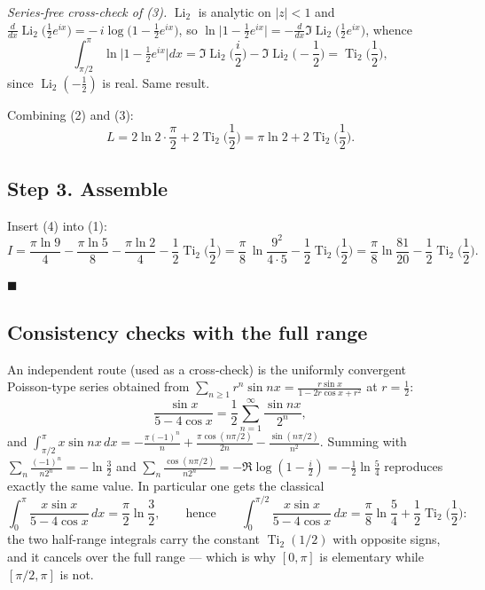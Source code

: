 \documentclass[11pt]{article}
\theoremstyle{remark}
\begin{document}
\textit{Series-free cross-check of (3).} $\operatorname{Li}_2$ is analytic on $|z|<1$ and $\frac{d}{dx}\operatorname{Li}_2\!\big(\tfrac12e^{ix}\big)=-\,i\log\!\big(1-\tfrac12e^{ix}\big)$, so $\ln\big|1-\tfrac12e^{ix}\big| = -\frac{d}{dx}\Im\operatorname{Li}_2\!\big(\tfrac12e^{ix}\big)$, whence
\[\int_{\pi/2}^{\pi}\ln\Big|1-\tfrac12e^{ix}\Big|dx=\Im\operatorname{Li}_2\Big(\frac i2\Big)-\Im\operatorname{Li}_2\Big(-\frac12\Big)=\operatorname{Ti}_2\Big(\frac12\Big),\]
since $\operatorname{Li}_2(-\tfrac12)$ is real. Same result.

Combining (2) and (3):
\[L=2\ln2\cdot\frac{\pi}{2}+2\operatorname{Ti}_2\Big(\frac12\Big)=\pi\ln 2+2\operatorname{Ti}_2\Big(\frac12\Big). \tag{4}\]

\subsection*{Step 3. Assemble}

Insert (4) into (1):
\[I=\frac{\pi\ln 9}{4}-\frac{\pi\ln 5}{8}-\frac{\pi\ln 2}{4}-\frac12\operatorname{Ti}_2\Big(\frac12\Big)
=\frac{\pi}{8}\,\ln\frac{9^{2}}{4\cdot 5}-\frac12\operatorname{Ti}_2\Big(\frac12\Big)
=\frac{\pi}{8}\ln\frac{81}{20}-\frac12\operatorname{Ti}_2\Big(\frac12\Big).\]

$\blacksquare$

\subsection*{Consistency checks with the full range}

An independent route (used as a cross-check) is the uniformly convergent Poisson-type series obtained from $\sum_{n\ge1}r^n\sin nx=\frac{r\sin x}{1-2r\cos x+r^2}$ at $r=\frac12$:
\[\frac{\sin x}{5-4\cos x}=\frac12\sum_{n=1}^{\infty}\frac{\sin nx}{2^{n}},\]
and $\int_{\pi/2}^{\pi}x\sin nx\,dx=-\frac{\pi(-1)^n}{n}+\frac{\pi\cos(n\pi/2)}{2n}-\frac{\sin(n\pi/2)}{n^2}$. Summing with $\sum_{n}\frac{(-1)^n}{n2^n}=-\ln\frac32$ and $\sum_n\frac{\cos(n\pi/2)}{n2^n}=-\Re\log(1-\tfrac i2)=-\frac12\ln\frac54$ reproduces exactly the same value. In particular one gets the classical
\[\int_{0}^{\pi}\frac{x\sin x}{5-4\cos x}\,dx=\frac{\pi}{2}\ln\frac32,
\qquad\text{hence}\qquad
\int_{0}^{\pi/2}\frac{x\sin x}{5-4\cos x}\,dx=\frac{\pi}{8}\ln\frac54+\frac12\operatorname{Ti}_2\Big(\frac12\Big):\]
the two half-range integrals carry the constant $\operatorname{Ti}_2(1/2)$ with opposite signs, and it cancels over the full range --- which is why $[0,\pi]$ is elementary while $[\pi/2,\pi]$ is not.
\end{document}
